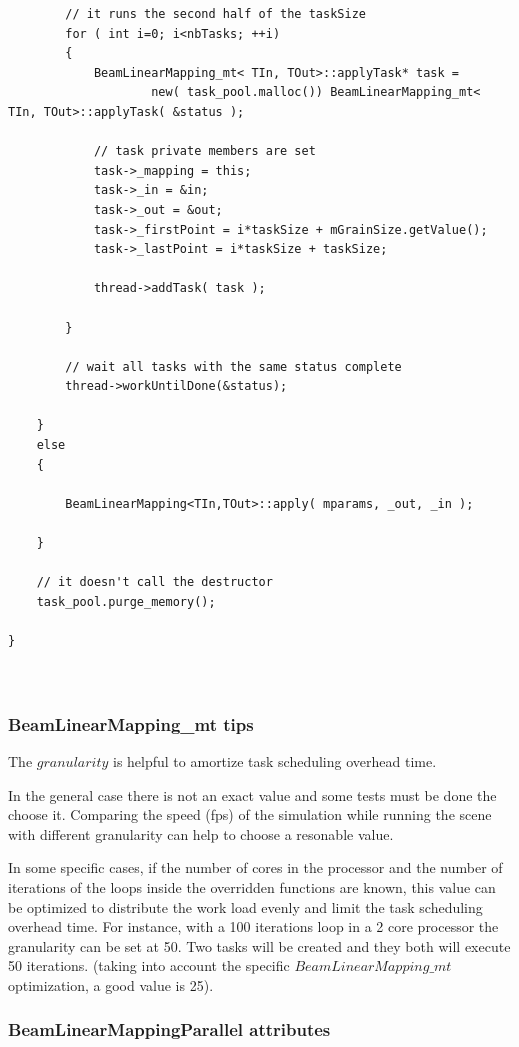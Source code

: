 \documentclass{article}
\begin{document}
\begin{lstlisting}
		// it runs the second half of the taskSize
		for ( int i=0; i<nbTasks; ++i)
		{
			BeamLinearMapping_mt< TIn, TOut>::applyTask* task = 
					new( task_pool.malloc()) BeamLinearMapping_mt< TIn, TOut>::applyTask( &status );

			// task private members are set
			task->_mapping = this;
			task->_in = &in;
			task->_out = &out;
			task->_firstPoint = i*taskSize + mGrainSize.getValue();
			task->_lastPoint = i*taskSize + taskSize;

			thread->addTask( task );

		}

		// wait all tasks with the same status complete
		thread->workUntilDone(&status);

	}
	else
	{

		BeamLinearMapping<TIn,TOut>::apply( mparams, _out, _in );

	}

	// it doesn't call the destructor
	task_pool.purge_memory();

}

	
\end{lstlisting}


\subsubsection{BeamLinearMapping\_mt tips}

The $granularity$ is helpful to amortize task scheduling overhead time. 

In the general case there is not an exact value and some tests must be done the choose it. Comparing the speed (fps) of the simulation while running the scene with different granularity can help to choose a resonable value.

In some specific cases, if the number of cores in the processor and the number of iterations of the loops inside the overridden functions are known, this value can be optimized to distribute the work load evenly and limit the task scheduling overhead time. For instance, with a 100 iterations loop in a 2 core processor the granularity can be set at 50. Two tasks will be created and they both will execute 50 iterations. (taking into account the specific $BeamLinearMapping\_mt$ optimization, a good value is 25). 



\subsubsection{BeamLinearMappingParallel attributes}
\end{document}
